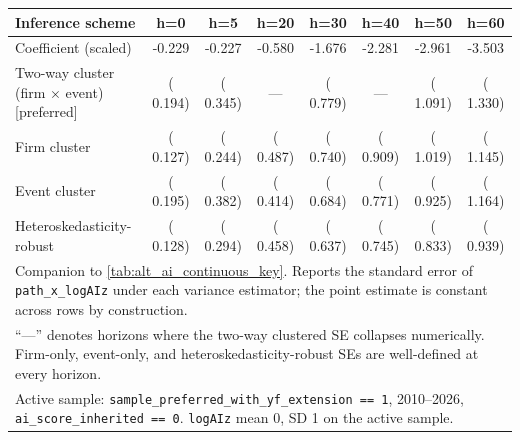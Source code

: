 \begin{tabular}{lccccccc}\hline\hline
Inference scheme & h=0 & h=5 & h=20 & h=30 & h=40 & h=50 & h=60 \\
\hline
Coefficient (scaled) & -0.229 & -0.227 & -0.580 & -1.676 & -2.281 & -2.961 & -3.503 \\
\hline
Two-way cluster (firm $\times$ event) [preferred] & ( 0.194) & ( 0.345) & --- & ( 0.779) & --- & ( 1.091) & ( 1.330) \\
Firm cluster & ( 0.127) & ( 0.244) & ( 0.487) & ( 0.740) & ( 0.909) & ( 1.019) & ( 1.145) \\
Event cluster & ( 0.195) & ( 0.382) & ( 0.414) & ( 0.684) & ( 0.771) & ( 0.925) & ( 1.164) \\
Heteroskedasticity-robust & ( 0.128) & ( 0.294) & ( 0.458) & ( 0.637) & ( 0.745) & ( 0.833) & ( 0.939) \\
\hline\hline
\multicolumn{8}{l}{\footnotesize Companion to \cref{tab:alt_ai_continuous_key}. Reports the standard error of \texttt{path\_x\_logAIz} under each variance estimator; the point estimate is constant across rows by construction.} \\
\multicolumn{8}{l}{\footnotesize ``---'' denotes horizons where the two-way clustered SE collapses numerically. Firm-only, event-only, and heteroskedasticity-robust SEs are well-defined at every horizon.} \\
\multicolumn{8}{l}{\footnotesize Active sample: \texttt{sample\_preferred\_with\_yf\_extension == 1}, 2010--2026, \texttt{ai\_score\_inherited == 0}. \texttt{logAIz} mean 0, SD 1 on the active sample.} \\
\end{tabular}

